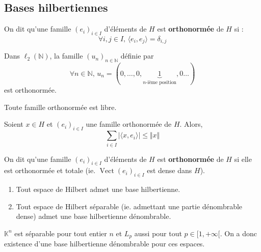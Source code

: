	\subsection{Bases hilbertiennes}


	\begin{definition}
		On dit qu'une famille $(e_i)_{i \in I}$ d'éléments de $H$ est \textbf{orthonormée} de $H$ si :
		\[ \forall i, j \in I, \, \langle e_i, e_j \rangle = \delta_{i,j} \]
	\end{definition}

	\begin{example}
		Dans $\ell_2(\mathbb{N})$, la famille $(u_n)_{n \in \mathbb{N}}$ définie par
		\[ \forall n \in \mathbb{N}, \, u_n = (0, \dots, 0, \underbrace{1}_{n \text{-ième position}}, 0 \dots) \]
		est orthonormée.
	\end{example}

	\begin{proposition}
		Toute famille orthonormée est libre.
	\end{proposition}

	\begin{proposition}
		Soient $x \in H$ et $(e_i)_{i \in I}$ une famille orthonormée de $H$. Alors,
		\[ \sum_{i \in I} \vert \langle x, e_i \rangle \vert \leq \Vert x \Vert \]
	\end{proposition}

	\begin{definition}
		On dit qu'une famille $(e_i)_{i \in I}$ d'éléments de $H$ est \textbf{orthonormée} de $H$ si elle est orthonormée et totale (ie. $\operatorname{Vect}(e_i)_{i \in I}$ est dense dans $H$).
	\end{definition}


	\begin{theorem}
		\begin{enumerate}[label=(\roman*)]
			\item Tout espace de Hilbert admet une base hilbertienne.
			\item Tout espace de Hilbert séparable (ie. admettant une partie dénombrable dense) admet une base hilbertienne dénombrable.
		\end{enumerate}
	\end{theorem}

	\begin{example}
		$\mathbb{K}^n$ est séparable pour tout entier $n$ et $L_p$ aussi pour tout $p \in [1,+\infty[$. On a donc existence d'une base hilbertienne dénombrable pour ces espaces.
	\end{example}

